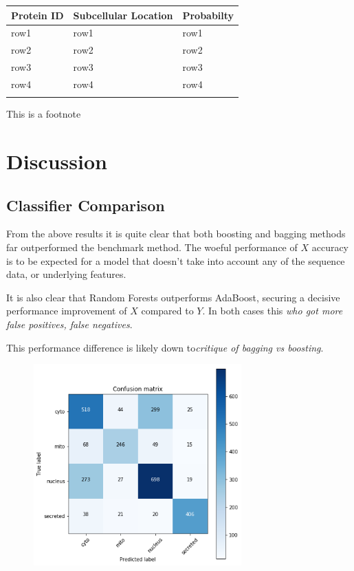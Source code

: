\documentclass{bioinfo}
\begin{document}
\begin{table}[!h]
 {\begin{tabular}{@{}lll@{}}\toprule Protein ID  & Subcellular Location & Probabilty \\\midrule
row1 & row1 & row1 \\
row2 & row2 & row2 \\
row3 & row3 & row3 \\
row4 & row4 & row4 \\\botrule
\end{tabular}}{This is a footnote}
\end{table}


\section{Discussion}

\subsection{Classifier Comparison}

From the above results it is quite clear that both boosting and bagging methods far outperformed the benchmark method. 
The woeful performance of $X$ accuracy is to be expected for a model that doesn't take into account any of the sequence data, or underlying features. 

It is also clear that Random Forests outperforms AdaBoost, securing a decisive performance improvement of $X$ compared to $Y$. In both cases this \textit{who got more false positives, false negatives}.

This performance difference is likely down to\textit {critique of bagging vs boosting}. 
\begin{figure}[!h]
\includegraphics[width=8cm]{confusion}
\centering
\end{figure}
\end{document}
